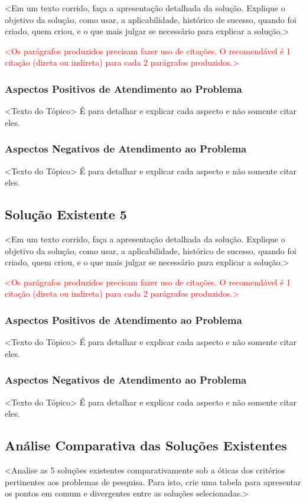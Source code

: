 <Em um texto corrido, faça a apresentação detalhada da solução. Explique o objetivo da solução, como usar, a aplicabilidade, histórico de sucesso, quando foi criado, quem criou, e o que mais julgar se necessário para explicar a solução.>

\textcolor{red}{
<Os parágrafos produzidos precisam fazer uso de citações.
O recomendável é 1 citação (direta ou indireta)
para cada 2 parágrafos produzidos.>
}

\subsubsection{Aspectos Positivos de Atendimento ao Problema}
<Texto do Tópico> É para detalhar e explicar cada aspecto e não somente citar eles.

\subsubsection{Aspectos Negativos de Atendimento ao Problema}
<Texto do Tópico> É para detalhar e explicar cada aspecto e não somente citar eles.

\subsection{Solução Existente 5}

<Em um texto corrido, faça a apresentação detalhada da solução. Explique o objetivo da solução, como usar, a aplicabilidade, histórico de sucesso, quando foi criado, quem criou, e o que mais julgar se necessário para explicar a solução.>

\textcolor{red}{
<Os parágrafos produzidos precisam fazer uso de citações.
O recomendável é 1 citação (direta ou indireta)
para cada 2 parágrafos produzidos.>
}

\subsubsection{Aspectos Positivos de Atendimento ao Problema}
<Texto do Tópico> É para detalhar e explicar cada aspecto e não somente citar eles.

\subsubsection{Aspectos Negativos de Atendimento ao Problema}
<Texto do Tópico> É para detalhar e explicar cada aspecto e não somente citar eles.

\subsection{ Análise Comparativa das Soluções Existentes}
<Analise as 5 soluções existentes comparativamente sob a óticas dos critérios pertinentes aos problemas de pesquisa. Para isto, crie uma tabela para apresentar os pontos em comum e divergentes entre as soluções selecionadas.>


